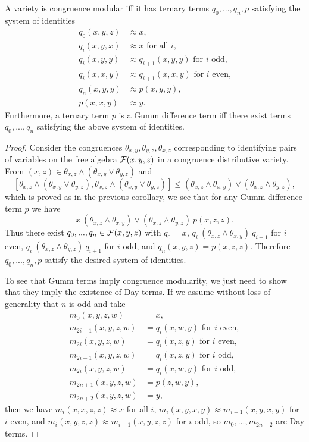 \begin{appendices}
\begin{thm}\label{gumm-terms} A variety is congruence modular iff it has ternary terms $q_0, ..., q_n, p$ satisfying the system of identities
\begin{align*}
q_0(x,y,z) &\approx x,\\
q_i(x,y,x) &\approx x\text{ for all }i,\\
q_i(x,y,y) &\approx q_{i+1}(x,y,y)\text{ for }i\text{ odd,}\\
q_i(x,x,y) &\approx q_{i+1}(x,x,y)\text{ for }i\text{ even,}\\
q_n(x,y,y) &\approx p(x,y,y),\\
p(x,x,y) &\approx y.
\end{align*}
Furthermore, a ternary term $p$ is a Gumm difference term iff there exist terms $q_0, ..., q_n$ satisfying the above system of identities.
\end{thm}
\begin{proof} Consider the congruences $\theta_{x,y}, \theta_{y,z}, \theta_{x,z}$ corresponding to identifying pairs of variables on the free algebra $\mathcal{F}(x,y,z)$ in a congruence distributive variety. From $(x,z) \in \theta_{x,z}\wedge (\theta_{x,y} \vee \theta_{y,z})$ and
\[
[\theta_{x,z}\wedge (\theta_{x,y} \vee \theta_{y,z}),\theta_{x,z}\wedge (\theta_{x,y} \vee \theta_{y,z})] \le (\theta_{x,z} \wedge \theta_{x,y}) \vee (\theta_{x,z} \wedge \theta_{y,z}),
\]
which is proved as in the previous corollary, we see that for any Gumm difference term $p$ we have
\[
x\ (\theta_{x,z} \wedge \theta_{x,y}) \vee (\theta_{x,z} \wedge \theta_{y,z})\ p(x,z,z).
\]
Thus there exist $q_0, ..., q_n \in \mathcal{F}(x,y,z)$ with $q_0 = x$, $q_i\ (\theta_{x,z} \wedge \theta_{x,y})\ q_{i+1}$ for $i$ even, $q_i\ (\theta_{x,z} \wedge \theta_{y,z})\ q_{i+1}$ for $i$ odd, and $q_n(x,y,z) = p(x,z,z)$. Therefore $q_0, ..., q_n, p$ satisfy the desired system of identities.

To see that Gumm terms imply congruence modularity, we just need to show that they imply the existence of Day terms. If we assume without loss of generality that $n$ is odd and take
\begin{align*}
m_0(x,y,z,w) &= x,\\
m_{2i-1}(x,y,z,w) &= q_i(x,w,y)\text{ for }i\text{ even},\\
m_{2i}(x,y,z,w) &= q_i(x,z,y)\text{ for }i\text{ even},\\
m_{2i-1}(x,y,z,w) &= q_i(x,z,y)\text{ for }i\text{ odd},\\
m_{2i}(x,y,z,w) &= q_i(x,w,y)\text{ for }i\text{ odd},\\
m_{2n+1}(x,y,z,w) &= p(z,w,y),\\
m_{2n+2}(x,y,z,w) &= y,
\end{align*}
then we have $m_i(x,x,z,z) \approx x$ for all $i$, $m_i(x,y,x,y) \approx m_{i+1}(x,y,x,y)$ for $i$ even, and $m_i(x,y,z,z) \approx m_{i+1}(x,y,z,z)$ for $i$ odd, so $m_0, ..., m_{2n+2}$ are Day terms.


\end{proof}
\end{appendices}
